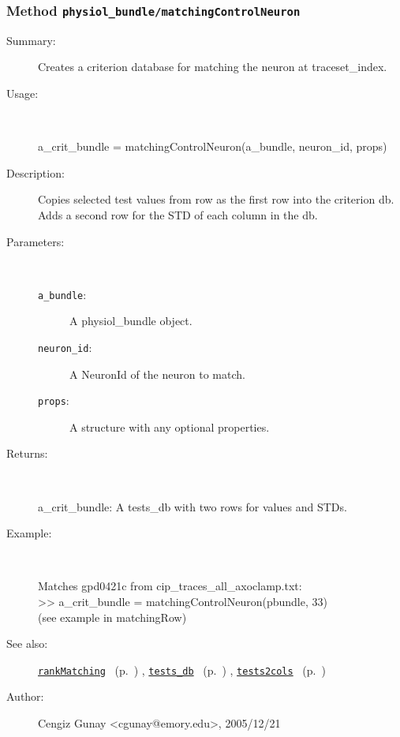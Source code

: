 \subsubsection[Method \texttt{matchingControlNeuron}]{Method \texttt{physiol\_bundle/matchingControlNeuron}}%
%
\label{ref_physiol_bundle__matchingControlNeuron}%
\hypertarget{ref_physiol_bundle__matchingControlNeuron}{}%
\begin{description}
\item[Summary:]Creates a criterion database for matching the neuron at traceset\_index.
%
\item[Usage:]~%
\begin{lyxcode}%
a\_crit\_bundle = matchingControlNeuron(a\_bundle, neuron\_id, props)
%
\end{lyxcode}%
%
\item[Description:]%
Copies selected test values from row as the first row into the 
 criterion db. Adds a second row for the STD of each column in the db.
\item[Parameters:]~
\begin{description}%
\item[\texttt{a\_bundle}:]
 A physiol\_bundle object.
\item[\texttt{neuron\_id}:]
 A NeuronId of the neuron to match.
\item[\texttt{props}:]
 A structure with any optional properties.
\end{description}%
%
\item[Returns:
]~

	a\_crit\_bundle: A tests\_db with two rows for values and STDs.
%
\item[Example:]~
\begin{lyxcode}        Matches gpd0421c from cip\_traces\_all\_axoclamp.txt:
\\%
        >> a\_crit\_bundle = matchingControlNeuron(pbundle, 33)
\\%
        (see example in matchingRow)
\\%
\end{lyxcode}
%
\item[See also:]%
\hyperlink{ref_rankMatching}{\texttt{rankMatching}}%
\ (p.~\pageref{ref_rankMatching})%
%
, \hyperlink{ref_tests_db}{\texttt{tests\_db}}%
\ (p.~\pageref{ref_tests_db})%
%
, \hyperlink{ref_tests2cols}{\texttt{tests2cols}}%
\ (p.~\pageref{ref_tests2cols})%
%
%
\item[Author:]%
Cengiz Gunay <cgunay@emory.edu>, 2005/12/21
%
\end{description}
\methodline%
